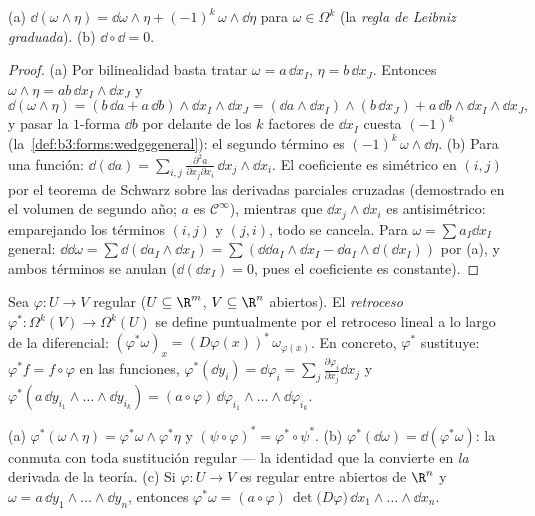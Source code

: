 \begin{theorem}\label{thm:b3:forms:dsquare}
(a) $\dd(\omega \wedge \eta) = \dd\omega \wedge \eta +
(-1)^k\,\omega \wedge \dd\eta$ para $\omega \in \Omega^k$ (la
\emph{regla de Leibniz graduada}). (b) $\dd \circ \dd = 0$.
\end{theorem}

\begin{proof}
(a) Por bilinealidad basta tratar $\omega = a\,\dd
x_I$, $\eta = b\,\dd x_J$. Entonces $\omega \wedge \eta =
ab\,\dd x_I \wedge \dd x_J$ y
\[
\dd(\omega\wedge\eta) = (b\,\dd a + a\,\dd b) \wedge \dd x_I
\wedge \dd x_J
= (\dd a \wedge \dd x_I) \wedge (b\,\dd x_J) +
a\,\dd b \wedge \dd x_I \wedge \dd x_J,
\]
y pasar la $1$-forma $\dd b$ por delante de los $k$ factores de $\dd
x_I$ cuesta $(-1)^k$ (la~\cref{def:b3:forms:wedgegeneral}): el segundo
término es $(-1)^k\,\omega \wedge \dd\eta$. (b) Para una función:
$\dd(\dd a) = \sum_{i,j}
\frac{\partial^2a}{\partial x_j\partial x_i}\,\dd x_j \wedge
\dd x_i$. El coeficiente es simétrico en $(i,j)$ por el teorema de
Schwarz sobre las derivadas parciales cruzadas (demostrado en el volumen
de segundo año; $a$ es $\mathcal C^\infty$), mientras que
$\dd x_j \wedge
\dd x_i$ es antisimétrico: emparejando los términos $(i,j)$ y $(j,i)$,
todo se cancela. Para $\omega = \sum
a_I\dd x_I$ general: $\dd\dd\omega = \sum\dd(\dd a_I \wedge \dd x_I)
= \sum(\dd\dd a_I\wedge\dd x_I - \dd a_I\wedge\dd(\dd x_I))$ por (a), y
ambos términos se anulan ($\dd(\dd x_I) = 0$, pues el coeficiente es
constante).
\end{proof}

\begin{definition}[Retroceso]\label{def:b3:forms:pullback}
Sea $\varphi\colon U \to V$ regular ($U \subseteq \R^m$,
$V \subseteq \R^n$ abiertos). El \emph{retroceso}
$\varphi^*\colon \Omega^k(V) \to \Omega^k(U)$ se define puntualmente por
el retroceso lineal a lo largo de la diferencial:
$(\varphi^*\omega)_x = (D\varphi(x))^*\,\omega_{\varphi(x)}$.
En concreto, $\varphi^*$ sustituye: $\varphi^*f = f \circ
\varphi$ en las funciones, $\varphi^*(\dd y_i) =
\dd\varphi_i = \sum_j\frac{\partial\varphi_i}{\partial
x_j}\dd x_j$ y $\varphi^*(a\,\dd y_{i_1}\wedge\dots\wedge
\dd y_{i_k}) =
(a\circ\varphi)\,\dd\varphi_{i_1}\wedge\dots\wedge
\dd\varphi_{i_k}$.
\end{definition}

\begin{theorem}\label{thm:b3:forms:pullback}
(a) $\varphi^*(\omega \wedge \eta) = \varphi^*\omega \wedge
\varphi^*\eta$ y $(\psi \circ \varphi)^* = \varphi^* \circ
\psi^*$. (b) $\varphi^*(\dd\omega) = \dd(\varphi^*\omega)$: la
 conmuta con toda sustitución
regular --- la identidad que la convierte en \emph{la} derivada de la
teoría. (c) Si $\varphi\colon U \to V$ es regular entre abiertos de
$\R^n$ y $\omega = a\,\dd y_1 \wedge \dots \wedge \dd
y_n$, entonces $\varphi^*\omega = (a \circ
\varphi)\,\det\bigl(D\varphi\bigr)\,\dd x_1 \wedge \dots
\wedge \dd x_n$.
\end{theorem}

